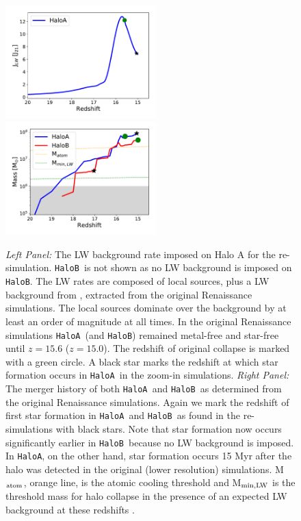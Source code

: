 \documentclass[graphics, twocolumn, usenatbib]{mn2e}
\newcommand{\ha} {\texttt{HaloA~}}
\newcommand{\hb} {\texttt{HaloB~}}
\newcommand{\hac} {\texttt{HaloA}}
\newcommand{\hbc} {\texttt{HaloB}}
\begin{document}
\begin{figure}
\centering
\begin{minipage}{175mm}      \begin{center} 
\centerline{
\includegraphics[width=0.52\textwidth]{FIGURES/Combined.pdf}
\includegraphics[width=0.52\textwidth]{FIGURES/MassRedshift.pdf}}
\caption{\textit{Left Panel:} The LW background rate imposed on Halo A for the re-simulation.
  \hb is not shown as no LW background is imposed on \hbc. The LW rates are composed of local
  sources, plus a LW background from \citet{Wise_2012b}, extracted from the original Renaissance
  simulations. The local sources dominate over the background by at least an order of magnitude at
  all times. In the original Renaissance simulations \ha (and \texttt{HaloB})  remained metal-free
  and star-free until $z = 15.6$ ($z = 15.0$). The redshift of original collapse is marked with a
  green circle. A black star marks the redshift at which star formation occurs in \ha in the
  zoom-in simulations.
  \textit{Right Panel:} The merger history of both \ha and \hb as determined from the original
  Renaissance simulations. Again we mark the redshift of first star formation
  in \ha and \hb as found in the re-simulations with black stars. Note that star formation now
  occurs significantly earlier in \hb because no LW background is imposed. In \hac, on the other
  hand, star formation occurs 15 Myr after the halo was detected in the original (lower resolution)
  simulations. M$_{\rm atom}$, orange line, is the atomic cooling threshold \citep{Fernandez_2014}
  and M$_{\rm min,LW}$ is the threshold mass for halo collapse in the presence of an expected LW
  background at these redshifts \citep{Machacek_2001, OShea_2008}.
  }  \label{Fig:LWHistory}
\end{center} \end{minipage}

\end{figure}
\end{document}
